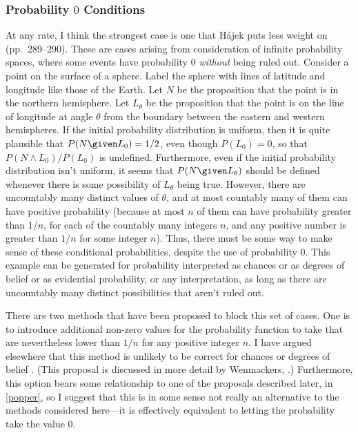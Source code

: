 \subsubsection{Probability $0$ Conditions}

At any rate, I think the strongest case is one that H\'{a}jek puts less weight on (pp.\ 289--290). These are cases arising from consideration of infinite probability spaces, where some events have probability $0$ \emph{without} being ruled out. Consider a point on the surface of a sphere. Label the sphere with lines of latitude and longitude like those of the Earth. Let $N$ be the proposition that the point is in the northern hemisphere. Let $L_\theta$ be the proposition that the point is on the line of longitude at angle $\theta$ from the boundary between the eastern and western hemispheres. If the initial probability distribution is uniform, then it is quite plausible that ${P(N \given L_0)}=1/2$, even though $P(L_0)=0$, so that $P(N\land L_0)/P(L_0)$ is undefined. Furthermore, even if the initial probability distribution isn't uniform, it seems that $P(N \given L_\theta)$ should be defined whenever there is some possibility of $L_\theta$ being true. However, there are uncountably many distinct values of $\theta$, and at most countably many of them can have positive probability (because at most $n$ of them can have probability greater than $1/n$, for each of the countably many integers $n$, and any positive number is greater than $1/n$ for some integer $n$). Thus, there must be some way to make sense of these conditional probabilities, despite the use of  probability $0$. This example can be generated for probability interpreted as chances or as degrees of belief or as evidential probability, or any interpretation, as long as there are uncountably many distinct possibilities that aren't ruled out.

There are two methods that have been proposed to block this set of cases. One is to introduce additional non-zero values for the probability function to take that are nevertheless lower than $1/n$ for any positive integer $n$. I have argued elsewhere that this method is unlikely to be correct for chances or degrees of belief \citep{easwaranregularity}. (This proposal is discussed in more detail by Wenmackers, .) Furthermore, this option bears some relationship to one of the proposals described later, in \autoref{popper}, so I suggest that this is in some sense not really an alternative to the methods considered here---it is effectively equivalent to letting the probability take the value $0$.

